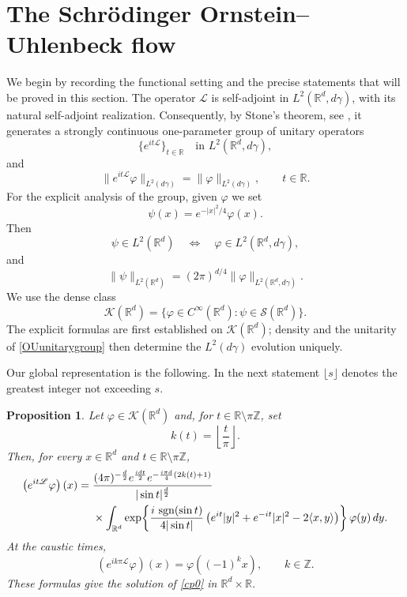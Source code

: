 \documentclass[11pt,a4paper]{amsart}
\def \R {\mathbb{R}}
\def \vf{\varphi}
\newcommand{\Rm}{\mathbb R^d}
\numberwithin{equation}{section}
\newtheorem{proposition}[theorem]{Proposition}
\numberwithin{equation}{section}
\begin{document}
\section{The Schr\"odinger Ornstein--Uhlenbeck flow}\label{S:senzadrift}

We begin by recording the functional setting and the precise statements that will be proved in this section.  The operator $\mathscr L$ is self-adjoint in $L^2(\Rm,d\gamma)$, with its natural self-adjoint realization.  Consequently, by Stone's theorem, see \cite[Theorem 1, p.~345]{Yo}, it generates a strongly continuous one-parameter group of unitary operators
\begin{equation}\label{OUunitarygroup}
\{e^{it\mathscr L}\}_{t\in\mathbb R}
\quad\text{in }L^2(\Rm,d\gamma),
\end{equation}
and
\begin{equation}\label{OUunitarity}
\|e^{it\mathscr L}\vf\|_{L^2(d\gamma)}
=\|\vf\|_{L^2(d\gamma)},\qquad t\in\mathbb R.
\end{equation}
For the explicit analysis of the group, given $\vf$ we set
\begin{equation}\label{psi}
\psi(x)=e^{-|x|^2/4}\vf(x).
\end{equation}
Then
\[
\psi\in L^2(\Rm)\quad\Longleftrightarrow\quad \vf\in L^2(\Rm,d\gamma),
\]
and
\begin{equation}\label{phipsi}
\|\psi\|_{L^2(\Rm)}=(2\pi)^{d/4}\|\vf\|_{L^2(\Rm,d\gamma)}.
\end{equation}
We use the dense class
\begin{equation}\label{K}
\mathscr K(\Rm)=\{\vf\in C^\infty(\Rm):\psi\in\mathscr S(\Rm)\}.
\end{equation}
The explicit formulas are first established on $\mathscr K(\Rm)$; density and the unitarity of \eqref{OUunitarygroup} then determine the $L^2(d\gamma)$ evolution uniquely.

Our global representation is the following.  In the next statement $\lfloor s\rfloor$ denotes the greatest integer not exceeding $s$.

\begin{proposition}\label{P:OUim}
Let $\vf\in\mathscr K(\Rm)$ and, for $t\in\R\setminus\pi\mathbb Z$, set
\[
k(t)=\left\lfloor\frac{t}{\pi}\right\rfloor.
\]
Then, for every $x\in\Rm$ and $t\in\R\setminus\pi\mathbb Z$,
\begin{align}\label{OUim}
\left(e^{it\mathscr L}\vf\right)(x)
={}&\frac{(4\pi)^{-\frac d2}e^{\frac{idt}{2}}
 e^{-\frac{i\pi d}{4}(2k(t)+1)}}{|\sin t|^{\frac d2}} \notag\\
&\times\int_{\Rm}
\exp\!\left\{
\frac{i\,\operatorname{sgn}(\sin t)}{4|\sin t|}
\left(e^{it}|y|^2+e^{-it}|x|^2-2\langle x,y\rangle\right)
\right\}\vf(y)\,dy.
\end{align}
At the caustic times,
\begin{equation}\label{OUim-caustic}
\left(e^{ik\pi\mathscr L}\vf\right)(x)=\vf((-1)^k x),\qquad k\in\mathbb Z.
\end{equation}
These formulas give the solution of \eqref{cp0} in $\Rm\times\R$.
\end{proposition}
\end{document}
